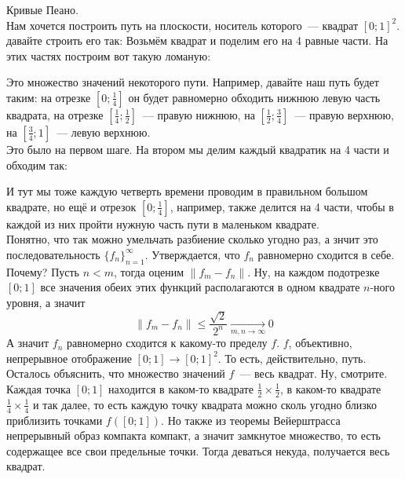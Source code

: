 \documentclass{article}
\begin{document}
    \begin{example}
        Кривые Пеано.\\
        Нам хочется построить путь на плоскости, носитель которого~--- квадрат $[0;1]^2$. давайте строить его так: Возьмём квадрат и поделим его на 4 равные части. На этих частях построим вот такую ломаную:
        \begin{figure}[H]
        \end{figure}\noindent
        Это множество значений некоторого пути. Например, давайте наш путь будет таким: на отрезке $\left[0;\frac14\right]$ он будет равномерно обходить нижнюю левую часть квадрата, на отрезке $\left[\frac14;\frac12\right]$~---  правую нижнюю, на $\left[\frac12;\frac34\right]$~--- правую верхнюю, на $\left[\frac34;1\right]$~--- левую верхнюю.\\
        Это было на первом шаге. На втором мы делим каждый квадратик на 4 части и обходим так:
        \begin{figure}[H]
        \end{figure}\noindent
        И тут мы тоже каждую четверть времени проводим в правильном большом квадрате, но ещё и отрезок $\left[0;\frac14\right]$, например, также делится на 4 части, чтобы в каждой из них пройти нужную часть пути в маленьком квадрате.\\
        Понятно, что так можно умельчать разбиение сколько угодно раз, а знчит это последовательность $\{f_n\}_{n=1}^\infty$. Утверждается, что $f_n$ равномерно сходится в себе. Почему? Пусть $n<m$, тогда оценим $\|f_m-f_n\|$. Ну, на каждом подотрезке $[0;1]$ все значения обеих этих функций располагаются в одном квадрате $n$-ного уровня, а значит
        $$
        \|f_m-f_n\|\leqslant\frac{\sqrt2}{2^n}\underset{m,n\to\infty}\longrightarrow0
        $$
        А значит $f_n$ равномерно сходится к какому-то пределу $f$. $f$, объективно, непрерывное отображение $[0;1]\to[0;1]^2$. То есть, действительно, путь.\\
        Осталось объяснить, что множество значений $f$~--- весь квадрат. Ну, смотрите. Каждая точка $[0;1]$ находится в каком-то квадрате $\frac12\times\frac12$, в каком-то квадрате $\frac14\times\frac14$ и так далее, то есть каждую точку квадрата можно сколь угодно близко приблизить точками $f([0;1])$. Но также из теоремы Вейерштрасса непрерывный образ компакта компакт, а значит замкнутое множество, то есть содержащее все свои предельные точки. Тогда деваться некуда, получается весь квадрат.
    \end{example}
\end{document}
